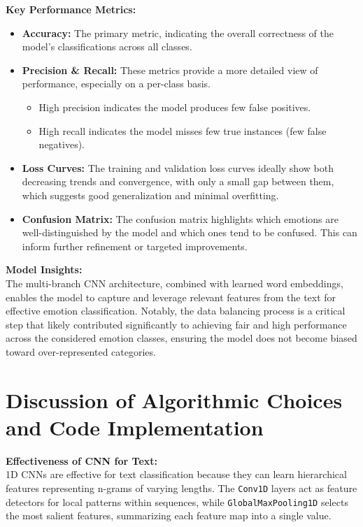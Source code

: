 \documentclass[twocolumn]{article}
\begin{document}
\vspace{0.5em}
\textbf{Key Performance Metrics:}
\begin{itemize}
    \item \textbf{Accuracy:} The primary metric, indicating the overall correctness of the model’s classifications across all classes.
    
    \item \textbf{Precision \& Recall:} These metrics provide a more detailed view of performance, especially on a per-class basis.
    \begin{itemize}
        \item High precision indicates the model produces few false positives.
        \item High recall indicates the model misses few true instances (few false negatives).
    \end{itemize}
    
    \item \textbf{Loss Curves:} The training and validation loss curves ideally show both decreasing trends and convergence, with only a small gap between them, which suggests good generalization and minimal overfitting.
    
    \item \textbf{Confusion Matrix:} The confusion matrix highlights which emotions are well-distinguished by the model and which ones tend to be confused. This can inform further refinement or targeted improvements.
\end{itemize}

\vspace{0.5em}
\textbf{Model Insights:} \\
The multi-branch CNN architecture, combined with learned word embeddings, enables the model to capture and leverage relevant features from the text for effective emotion classification. Notably, the data balancing process is a critical step that likely contributed significantly to achieving fair and high performance across the considered emotion classes, ensuring the model does not become biased toward over-represented categories.

\section{Discussion of Algorithmic Choices and Code Implementation}

\vspace{0.5em}
\textbf{Effectiveness of CNN for Text:} \\
1D CNNs are effective for text classification because they can learn hierarchical features representing n-grams of varying lengths. The \texttt{Conv1D} layers act as feature detectors for local patterns within sequences, while \texttt{GlobalMaxPooling1D} selects the most salient features, summarizing each feature map into a single value.
\end{document}
